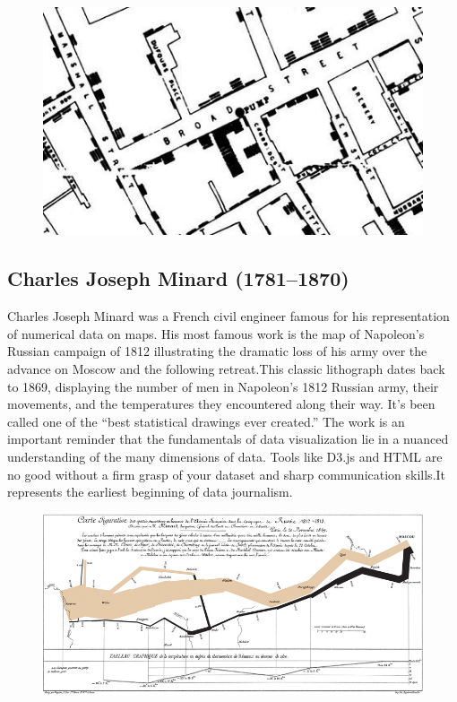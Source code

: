 \documentclass[]{book}
\theoremstyle{definition}
\theoremstyle{definition}
\theoremstyle{definition}
\theoremstyle{remark}
\begin{document}
\begin{figure}
\centering
\includegraphics{images/Snow.png}
\caption{}
\end{figure}

\subsection{Charles Joseph Minard
(1781--1870)}\label{charles-joseph-minard-17811870}

Charles Joseph Minard was a French civil engineer famous for his
representation of numerical data on maps. His most famous work is the
map of Napoleon's Russian campaign of 1812 illustrating the dramatic
loss of his army over the advance on Moscow and the following
retreat.This classic lithograph dates back to 1869, displaying the
number of men in Napoleon's 1812 Russian army, their movements, and the
temperatures they encountered along their way. It's been called one of
the ``best statistical drawings ever created.'' The work is an important
reminder that the fundamentals of data visualization lie in a nuanced
understanding of the many dimensions of data. Tools like D3.js and HTML
are no good without a firm grasp of your dataset and sharp communication
skills.It represents the earliest beginning of data journalism.

\begin{figure}
\centering
\includegraphics{images/Minard.png}
\caption{}
\end{figure}
\end{document}
